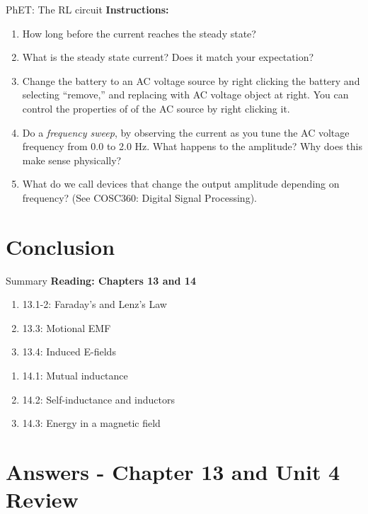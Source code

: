 \documentclass{beamer}
\begin{document}
\begin{frame}{PhET: The RL circuit}
\small
\textbf{Instructions:}
\begin{enumerate}
\item How long before the current reaches the steady state?
\item What is the steady state current? Does it match your expectation?
\item Change the battery to an AC voltage source by right clicking the battery and selecting ``remove,'' and replacing with AC voltage object at right.  You can control the properties of of the AC source by right clicking it.
\item Do a \textit{frequency sweep}, by observing the current as you tune the AC voltage frequency from 0.0 to 2.0 Hz.  What happens to the amplitude?  Why does this make sense physically?
\item What do we call devices that change the output amplitude depending on frequency? (See COSC360: Digital Signal Processing).
\end{enumerate}
\end{frame}

\section{Conclusion}

\begin{frame}{Summary}
\textbf{Reading: Chapters 13 and 14} \\ \vspace{0.5cm}
\begin{enumerate}
\item 13.1-2: Faraday's and Lenz's Law
\item 13.3: Motional EMF
\item 13.4: Induced E-fields
\end{enumerate}
\begin{enumerate}
\item 14.1: Mutual inductance
\item 14.2: Self-inductance and inductors
\item 14.3: Energy in a magnetic field
\end{enumerate}
\end{frame}

\section{Answers - Chapter 13 and Unit 4 Review}
\end{document}
